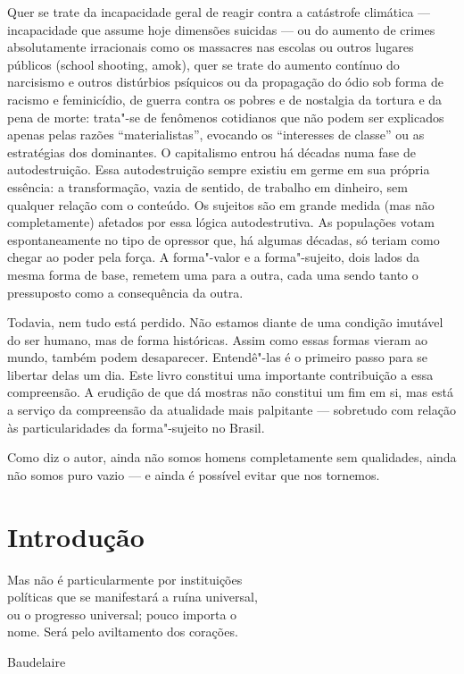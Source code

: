 Quer se trate da incapacidade geral de reagir contra a catástrofe
climática --- incapacidade que assume hoje dimensões suicidas --- ou do
aumento de crimes absolutamente irracionais como os massacres nas
escolas ou outros lugares públicos (school shooting, amok), quer se
trate do aumento contínuo do narcisismo e outros distúrbios psíquicos ou
da propagação do ódio sob forma de racismo e feminicídio, de guerra
contra os pobres e de nostalgia da tortura e da pena de morte: trata"-se
de fenômenos cotidianos que não podem ser explicados apenas pelas razões
``materialistas'', evocando os ``interesses de classe'' ou as
estratégias dos dominantes. O capitalismo entrou há décadas numa fase de
autodestruição. Essa autodestruição sempre existiu em germe em sua
própria essência: a transformação, vazia de sentido, de trabalho em
dinheiro, sem qualquer relação com o conteúdo. Os sujeitos são em grande
medida (mas não completamente) afetados por essa lógica autodestrutiva.
As populações votam espontaneamente no tipo de opressor que, há algumas
décadas, só teriam como chegar ao poder pela força. A forma"-valor e a
forma"-sujeito, dois lados da mesma forma de base, remetem uma para a
outra, cada uma sendo tanto o pressuposto como a consequência da outra.

Todavia, nem tudo está perdido. Não estamos diante de uma condição
imutável do ser humano, mas de forma históricas. Assim como essas formas
vieram ao mundo, também podem desaparecer. Entendê"-las é o primeiro
passo para se libertar delas um dia. Este livro constitui uma importante
contribuição a essa compreensão. A erudição de que dá mostras não
constitui um fim em si, mas está a serviço da compreensão da atualidade
mais palpitante --- sobretudo com relação às particularidades da
forma"-sujeito no Brasil.

Como diz o autor, ainda não somos homens completamente sem qualidades,
ainda não somos puro vazio --- e ainda é possível evitar que nos
tornemos.

\chapter*{Introdução}

\epigraph{Mas não é particularmente por instituições\\
políticas que se manifestará a ruína universal,\\
ou o progresso universal; pouco importa o\\
nome. Será pelo aviltamento dos corações.}{Baudelaire}


